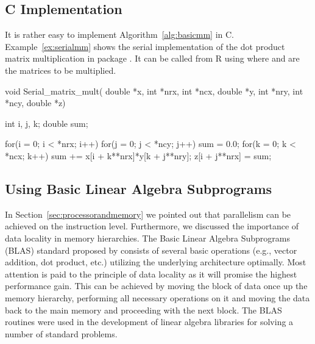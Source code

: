 

\subsection{C Implementation}

It is rather easy to implement Algorithm~\ref{alg:basicmm} in C. 
Example~\ref{ex:serialmm} shows the serial implementation of the dot
product matrix multiplication in package . It can be called
from R using  where  and
 are the matrices to be multiplied.

\begin{Example}
\label{ex:serialmm}
\begin{Scode}
void Serial_matrix_mult( double *x, int *nrx, int *ncx,
			 double *y, int *nry, int *ncy,
			 double *z) {
  int i, j, k;
  double sum;

  for(i = 0; i < *nrx; i++)
    for(j = 0; j < *ncy; j++){
      sum = 0.0;
      for(k = 0; k < *ncx; k++)
	sum += x[i + k**nrx]*y[k + j**nry];
      z[i + j**nrx] = sum;
    }
}
\end{Scode}
\end{Example}

\subsection{Using Basic Linear Algebra Subprograms}
\label{sec:blas}
In Section~\ref{sec:processorandmemory} we pointed out that
parallelism can be achieved on the instruction level. Furthermore, we
discussed  the importance of data locality in memory hierarchies. The
Basic Linear Algebra Subprograms (BLAS) standard proposed by
\cite{lawson79bla} consists of several basic operations (e.g., vector
addition, dot product, etc.) utilizing the underlying architecture
optimally. Most attention is paid to the principle of data locality as
it will promise the highest performance gain. This can be achieved by
moving the block of data once up the memory hierarchy, performing all
necessary operations on it and moving the data back to the main memory
and proceeding with the next block. The BLAS routines were used in the
development of linear algebra libraries for solving a number of
standard problems.

